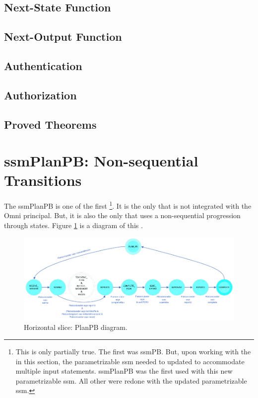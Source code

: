 \documentclass[../../main/main.tex]{subfiles}
\begin{document}
\subsection{Next-State Function}
\subsection{Next-Output Function}
\subsection{Authentication}
\HOLssmPlanPBTheoremsinputOKXXdef


\HOLPBIntegratedDefTheoremsgetOmniCommandXXdef


\subsection{Authorization}
\subsection{Proved Theorems}



\section{ssmPlanPB: Non-sequential Transitions}
The ssmPlanPB  is one of the first \footnote{This is only partially true.  The first  was ssmPB.  But, upon working with the  in this section, the parametrizable ssm needed to updated to accommodate multiple input statements.  ssmPlanPB was the first  used with this new parametrizable ssm.  All other  were redone with the updated parametrizable ssm.}. It is the only  that is not integrated with the Omni principal.  But, it is also the only  that uses a non-sequential progression through states.  Figure \ref{ssmPlanPBDiagram2} is a diagram of this .

\begin{figure}[h!]
\centering
\includegraphics[width=\textwidth]{../figures/ssmPlanPBDiagram}
\caption{\label{ssmPlanPBDiagram2} Horizontal slice: PlanPB diagram.}
\end{figure}
\end{document}
